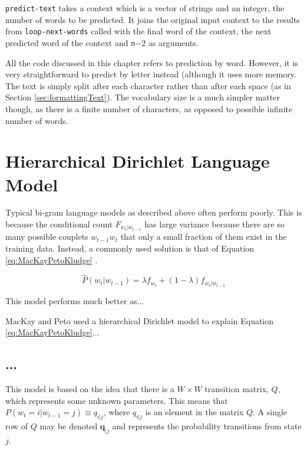 \lstinline!predict-text! takes a context which is a vector of strings and an integer, the number of words to be predicted. It joins the original input context to the results from \lstinline!loop-next-words! called with the final word of the context, the next predicted word of the context and \lstinline!n!$-2$ as arguments.

All the code discussed in this chapter refers to prediction by word. However, it is very straightforward to predict by letter instead (although it uses more memory. The text is simply split after each character rather than after each space (as in Section \ref{sec:formattingText}). The vocabulary size is a much simpler matter though, as there is a finite number of characters, as opposed to possible infinite number of words.

\section{Hierarchical Dirichlet Language Model}

Typical bi-gram language models as described above often perform poorly. This is because the conditional count $F_{w_{t}|w_{t-1}}$ has large variance because there are so many possible couplets $w_{t-1}w_{t}$ that only a small fraction of them exist in the training data. Instead, a commonly used solution is that of Equation \ref{eq:MacKayPetoKludge} \cite{mackay1995hierarchical}.

\begin{equation}
\hat{P}(w_{t}|w_{t-1})=\lambda f_{w_{t}}+(1-\lambda)f_{w_{t}|w_{t-1}}
\label{eq:MacKayPetoKludge}
\end{equation}

\noindent This model performs much better as...

MacKay and Peto \cite{mackay1995hierarchical} used a hierarchical Dirichlet model to explain Equation \ref{eq:MacKayPetoKludge}...

\subsection{...}

This model is based on the idea that there is a $W\times W$ transition matrix, $Q$, which represents some unknown parameters. This means that $P(w_{t}=i|w_{t-1}=j)\equiv q_{i|j}$, where $q_{i|j}$ is an element in the matrix $Q$. A single row of $Q$ may be denoted $\boldsymbol{q}_{|j}$ and represents the probability transitions from state $j$.

